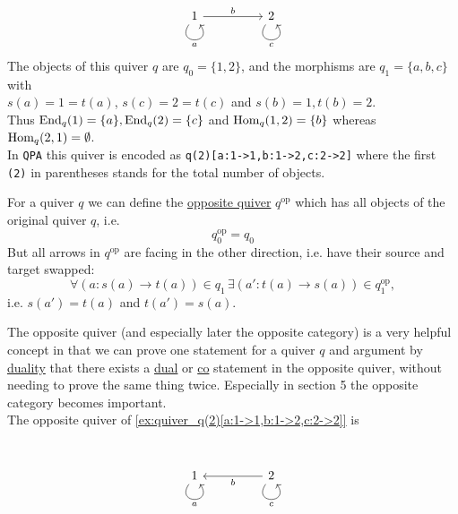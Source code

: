 \begin{example}\label{ex:quiver_q(2)[a:1->1,b:1->2,c:2->2]}\phantom{}\\
\[
\begin{tikzcd}
1 \arrow["a"', loop, distance=2em, in=305, out=235] \arrow[rr, "b"] &  & 2 \arrow["c"', loop, distance=2em, in=305, out=235]
\end{tikzcd}
\]
The objects of this quiver $q$ are $q_{0} = \{1, 2\}$, and the morphisms are $q_{1} = \{a, b, c\}$ with\\
$s (a) = 1 = t (a)$, $s (c) = 2 = t (c)$ and $s (b) = 1, t (b) = 2$.\\
\noindent Thus $\textup{End}_{q}(1) = \{a\}, \textup{End}_{q}(2) = \{c\}$ and $\textup{Hom}_{q}(1,2) = \{b\}$ whereas
$\textup{Hom}_{q}(2,1)=\emptyset$.\\

\noindent In \texttt{QPA} this quiver is encoded as \texttt{q(2)[a:1->1,b:1->2,c:2->2]} where the first \texttt{(2)} in parentheses stands for the total
number of objects.
\end{example}

\begin{definition}
For a quiver $q$ we can define the \ul{opposite quiver} $q^{\text{op}}$ which has all objects of the original quiver $q$, i.e.
\[
q^{\text{op}}_{0} = q_{0}
\]
But all arrows in $q^{\text{op}}$ are facing in the other direction, i.e. have their source and target swapped:
\[
\forall (a : s(a) \rightarrow t(a)) \in q_{1}\,\exists (a' : t(a) \rightarrow s(a)) \in q^{\text{op}}_{1},
\]
i.e. $s(a') = t(a)$ and $t(a') = s(a)$.
\end{definition}

The opposite quiver (and especially later the opposite category) is a very helpful concept in that we can prove one statement for a quiver $q$
and argument by \ul{duality} that there exists a \ul{dual} or \ul{co} statement in the opposite quiver, without needing to prove the same thing
twice. Especially in section 5 the opposite category becomes important.\\

The opposite quiver of \ref{ex:quiver_q(2)[a:1->1,b:1->2,c:2->2]} is

\begin{example}\label{ex:quiver_q(2)[a:1->1,b:2->1,c:2->2]}\phantom{}\\
\[
\begin{tikzcd}
1 \arrow["a"', loop, distance=2em, in=305, out=235] &  & 2 \arrow["c"', loop, distance=2em, in=305, out=235] \arrow[ll, "b"]
\end{tikzcd}
\]
\end{example}

